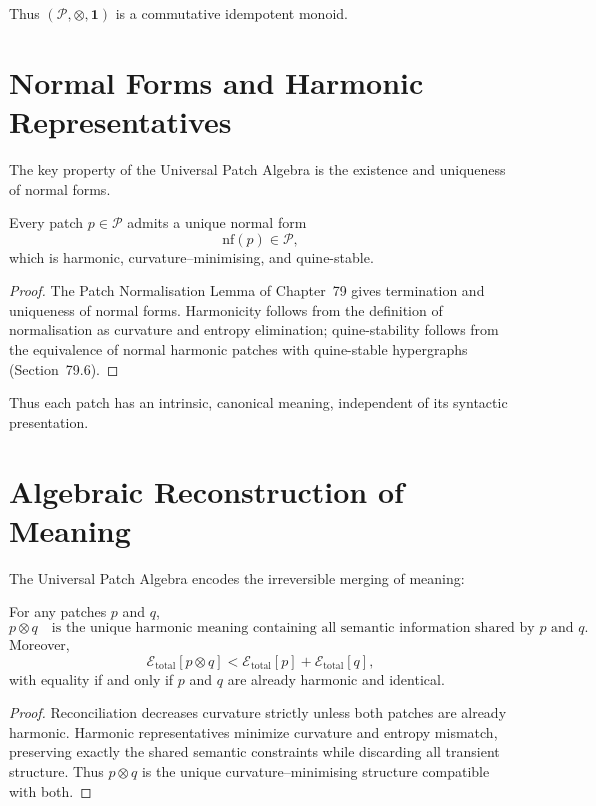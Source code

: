 Thus $(\mathcal{P},\otimes,\mathbf{1})$ is a commutative idempotent
monoid.

\section{Normal Forms and Harmonic Representatives}
\label{sec:80-2}

The key property of the Universal Patch Algebra is the existence and
uniqueness of normal forms.

\begin{theorem}[Normalization]
\label{thm:80-normalisation}
Every patch $p\in\mathcal{P}$ admits a unique normal form
\[
\mathrm{nf}(p)\in\mathcal{P},
\]
which is harmonic, curvature–minimising, and quine-stable.
\end{theorem}

\begin{proof}
The Patch Normalisation Lemma of Chapter~79 gives termination and
uniqueness of normal forms.  
Harmonicity follows from the definition of normalisation as curvature and
entropy elimination; quine-stability follows from the equivalence of
normal harmonic patches with quine-stable hypergraphs
(Section~79.6).
\end{proof}

Thus each patch has an intrinsic, canonical meaning, independent of its
syntactic presentation.

\section{Algebraic Reconstruction of Meaning}
\label{sec:80-3}

The Universal Patch Algebra encodes the irreversible merging of meaning:

\begin{theorem}
\label{thm:80-irreversible}
For any patches $p$ and $q$,
\[
p\otimes q
\quad\text{is the unique harmonic meaning containing all semantic
information shared by $p$ and $q$.}
\]
Moreover,
\[
\mathcal{E}_{\mathrm{total}}[p\otimes q]
  < \mathcal{E}_{\mathrm{total}}[p]
  + \mathcal{E}_{\mathrm{total}}[q],
\]
with equality if and only if $p$ and $q$ are already harmonic and identical.
\end{theorem}

\begin{proof}
Reconciliation decreases curvature strictly unless both patches are
already harmonic.  
Harmonic representatives minimize curvature and entropy mismatch,
preserving exactly the shared semantic constraints while discarding all
transient structure.  
Thus $p\otimes q$ is the unique curvature–minimising structure compatible
with both.
\end{proof}

